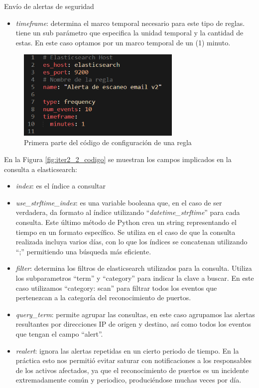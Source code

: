 \begin{section}{Envío de alertas de seguridad}
\begin{itemize}
        \item \textit{timeframe}: determina el marco temporal necesario para este tipo de reglas. tiene un sub parámetro que especifica la unidad temporal y la cantidad de estas. En este caso optamos por un marco temporal de un (1) minuto.
    \end{itemize}
    \begin{figure}[H]
    \centering
        \includegraphics[width=0.7\textwidth]{./iteracion_2_imagenes/3-codigoAlerta-1.png}
        \caption{Primera parte del código de configuración de una regla}
        \label{fig:iter2_1_codigo}
    \end{figure}
    \FloatBarrier
    En la Figura \ref{fig:iter2_2_codigo} se muestran los campos implicados en la consulta a elasticsearch:
    \begin{itemize}
        \item \textit{index}: es el índice a consultar
        \item \textit{use\_strftime\_index}: es una variable booleana que, en el caso de ser verdadera, da formato al índice utilizando “\textit{datetime\_strftime}” para cada consulta. Este último método de Python crea un string representando el tiempo en un formato específico. Se utiliza en el caso de que la consulta realizada incluya varios días, con lo que los índices se concatenan utilizando “;” permitiendo una búsqueda más eficiente.
        \item \textit{filter}: determina los filtros de elasticsearch utilizados para la consulta. Utiliza los subparametros “term”  y “category” para indicar la clave a buscar. En este caso utilizamos “category: scan” para filtrar todos los eventos que pertenezcan a la categoría del reconocimiento de puertos.
        \item \textit{query\_term}: permite agrupar las consultas, en este caso agrupamos las alertas resultantes por direcciones IP de origen y destino, así como todos los eventos que tengan el campo “alert”.
        \item \textit{realert}: ignora las alertas repetidas en un cierto periodo de tiempo. En la práctica esto nos permitió evitar saturar con notificaciones a los responsables de los activos afectados, ya que el reconocimiento de puertos es un incidente extremadamente común y periodico, produciéndose muchas veces por día.

\end{itemize}
\end{section}
